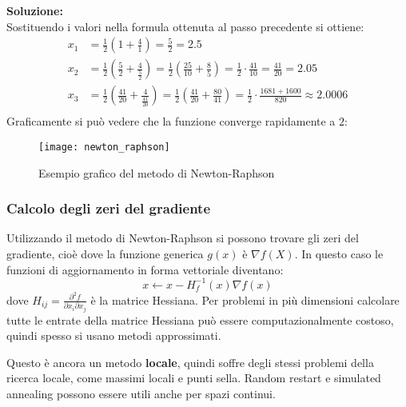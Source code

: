 \documentclass[a4paper]{article}
\begin{document}
\begin{example}
\begin{enumerate}
      \vspace{1em}
      \noindent
      \textbf{Soluzione:}\\
      Sostituendo i valori nella formula ottenuta al passo precedente si ottiene:
      \[
      \begin{aligned}
        x_1 &= \frac{1}{2} \left( 1 + \frac{4}{1} \right) = \frac{5}{2} = 2.5\\
        x_2 &= \frac{1}{2} \left( \frac{5}{2} + \frac{4}{\frac{5}{2}} \right)
              = \frac{1}{2} \left( \frac{25}{10} + \frac{8}{5} \right)
              = \frac{1}{2} \cdot \frac{41}{10} = \frac{41}{20} = 2.05\\
        x_3 &= \frac{1}{2} \left( \frac{41}{20} + \frac{4}{\frac{41}{20}} \right)
              = \frac{1}{2} \left( \frac{41}{20} + \frac{80}{41} \right)
              = \frac{1}{2} \cdot \frac{1681 + 1600}{820}
              \approx 2.0006\\
      \end{aligned}
      \] 
      Graficamente si può vedere che la funzione converge rapidamente a \( 2 \):
      \begin{figure}[H]
        \centering
        \texttt{[image: newton\_raphson]}
        \caption{Esempio grafico del metodo di Newton-Raphson}
      \end{figure}
  \end{enumerate}
\end{example}

\subsubsection{Calcolo degli zeri del gradiente}
Utilizzando il metodo di Newton-Raphson si possono trovare gli zeri del gradiente,
cioè dove la funzione generica \( g(x) \) è \( \nabla f(X) \). In questo caso
le funzioni di aggiornamento in forma vettoriale diventano:
\[
  x \leftarrow x - H^{-1}_f(x) \nabla f(x)
\] 
dove \( H_{ij} = \frac{\partial^2 f}{\partial x_i \partial x_j} \) è la matrice Hessiana.
Per problemi in più dimensioni calcolare tutte le entrate della matrice Hessiana può
essere computazionalmente costoso, quindi spesso si usano metodi approssimati.

\vspace{1em}
\noindent
Questo è ancora un metodo \textbf{locale}, quindi soffre degli stessi problemi
della ricerca locale, come massimi locali e punti sella. Random restart e
simulated annealing possono essere utili anche per spazi continui.
\end{document}
